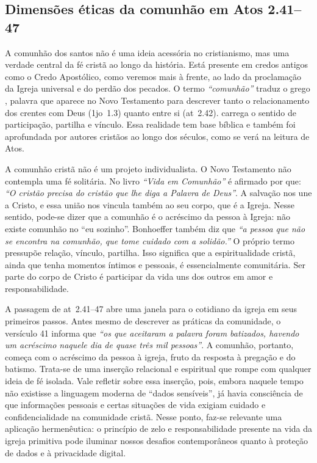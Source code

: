 \subsection{Dimensões éticas da comunhão em Atos 2.41–47}

A comunhão dos santos não é uma ideia acessória no cristianismo, mas uma verdade central da fé cristã ao longo da história. Está presente em credos antigos como o Credo Apostólico, como veremos mais à frente, ao lado da proclamação da Igreja universal e do perdão dos pecados. O termo \textit{``comunhão''} traduz o grego \textit{}, palavra que aparece no Novo Testamento para descrever tanto o relacionamento dos crentes com Deus (\gls{1jo}~1.3) quanto entre si (\gls{at}~2.42). \textit{} carrega o sentido de participação, partilha e vínculo. Essa realidade tem base bíblica e também foi aprofundada por autores cristãos ao longo dos séculos, como se verá na leitura de Atos.

A comunhão cristã não é um projeto individualista. O Novo Testamento não contempla uma fé solitária. No livro \textit{``Vida em Comunhão''} é afirmado por  que: \textit{``O cristão precisa do cristão que lhe diga a Palavra de Deus''}. A salvação nos une a Cristo, e essa união nos vincula também ao seu corpo, que é a Igreja. Nesse sentido, pode-se dizer que a comunhão é o acréscimo da pessoa à Igreja: não existe comunhão no ``eu sozinho''. Bonhoeffer também diz que \textit{``a pessoa que não se encontra na comunhão, que tome cuidado com a solidão.''} \cite[p.~59]{bonhoeffer1997} O próprio termo \textit{} pressupõe relação, vínculo, partilha. Isso significa que a espiritualidade cristã, ainda que tenha momentos íntimos e pessoais, é essencialmente comunitária. Ser parte do corpo de Cristo é participar da vida uns dos outros em amor e responsabilidade.

A passagem de \gls{at}~2.41–47 abre uma janela para o cotidiano da igreja em seus primeiros passos. Antes mesmo de descrever as práticas da comunidade, o versículo 41 informa que \textit{``os que aceitaram a palavra foram batizados, havendo um acréscimo naquele dia de quase três mil pessoas''}. A comunhão, portanto, começa com o acréscimo da pessoa à igreja, fruto da resposta à pregação e do batismo. Trata-se de uma inserção relacional e espiritual que rompe com qualquer ideia de fé isolada. Vale refletir sobre essa inserção, pois, embora naquele tempo não existisse a linguagem moderna de ``dados sensíveis'', já havia consciência de que informações pessoais e certas situações de vida exigiam cuidado e confidencialidade na comunidade cristã. Nesse ponto, faz-se relevante uma aplicação hermenêutica: o princípio de zelo e responsabilidade presente na vida da igreja primitiva pode iluminar nossos desafios contemporâneos quanto à proteção de dados e à privacidade digital.

